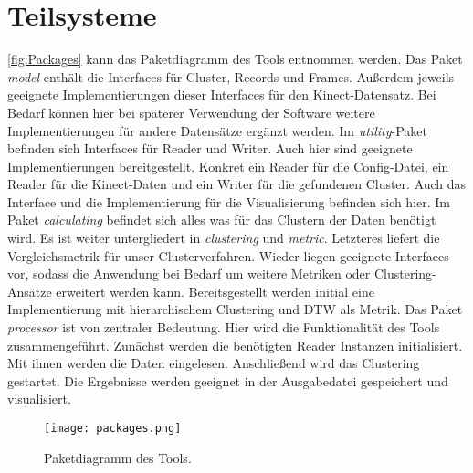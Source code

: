 \section{Teilsysteme}
\label{4-Teilsysteme}
\autoref{fig:Packages} kann das Paketdiagramm des Tools entnommen werden.
Das Paket \emph{model} enthält die Interfaces für Cluster, Records und Frames.
Außerdem jeweils geeignete Implementierungen dieser Interfaces für den Kinect-Datensatz.
Bei Bedarf können hier bei späterer Verwendung der Software weitere Implementierungen
für andere Datensätze ergänzt werden.
Im \emph{utility}-Paket befinden sich Interfaces für Reader und Writer.
Auch hier sind geeignete Implementierungen bereitgestellt.
Konkret ein Reader für die Config-Datei, ein Reader für die Kinect-Daten
und ein Writer für die gefundenen Cluster.
Auch das Interface und die Implementierung für die Visualisierung befinden sich hier.
Im Paket \emph{calculating} befindet sich alles was für das Clustern der Daten benötigt wird.
Es ist weiter untergliedert in \emph{clustering} und \emph{metric}.
Letzteres liefert die Vergleichsmetrik für unser Clusterverfahren.
Wieder liegen geeignete Interfaces vor,
sodass die Anwendung bei Bedarf um weitere Metriken oder Clustering-Ansätze erweitert werden kann.
Bereitsgestellt werden initial eine Implementierung mit hierarchischem Clustering
und \ac{DTW} als Metrik.
Das Paket \emph{processor} ist von zentraler Bedeutung.
Hier wird die Funktionalität des Tools zusammengeführt.
Zunächst werden die benötigten Reader Instanzen initialisiert.
Mit ihnen werden die Daten eingelesen.
Anschließend wird das Clustering gestartet.
Die Ergebnisse werden geeignet in der Ausgabedatei gespeichert und visualisiert.
\begin{figure}[ht]
    \begin{center}
    \texttt{[image: packages.png]}
    \end{center}
    \caption{Paketdiagramm des Tools.}
    \label{fig:Packages}
\end{figure}